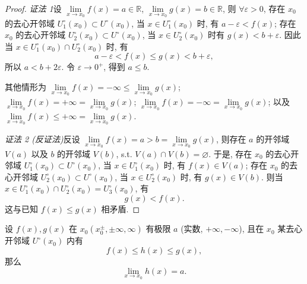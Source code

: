 \begin{proof}
\textit{证法 1}\quad 设 $\lim\limits_{x \to x_0} f(x) = a \in \mathbb{R}$, $\lim\limits_{x \to x_0} g(x) = b \in \mathbb{R}$, 则 $\forall \varepsilon > 0$, 存在 $x_0$ 的去心开邻域 $U_1^\circ(x_0) \subset U^\circ(x_0)$, 当 $x \in U_1^\circ(x_0)$ 时, 有 $a - \varepsilon < f(x)$; 存在 $x_0$ 的去心开邻域 $U_2^\circ(x_0) \subset U^\circ(x_0)$, 当 $x \in U_2^\circ(x_0)$ 时有 $g(x) < b + \varepsilon$. 因此当 $x \in U_1^\circ(x_0) \cap U_2^\circ(x_0)$ 时, 有
\[
a-\varepsilon<f(x)\leqslant g(x)<b+\varepsilon,
\]
所以 $a < b + 2\varepsilon$. 令 $\varepsilon \to 0^{+}$, 得到 $a \leqslant b$.

其他情形为 $\lim\limits_{x \to x_0} f(x) = -\infty \leqslant \lim\limits_{x \to x_0} g(x)$; $\lim\limits_{x \to x_0} f(x) = +\infty = \lim\limits_{x \to x_0} g(x)$; $\lim\limits_{x \to x_0} f(x) = -\infty = \lim\limits_{x \to x_0} g(x)$; 以及 $\lim\limits_{x \to x_0} f(x) \leqslant +\infty = \lim\limits_{x \to x_0} g(x)$.

\textit{证法 2 (反证法)}\quad 反设 $\lim\limits_{x\to x_{0}}f(x)=a>b=\lim\limits_{x\to x_{0}}g(x)$, 则存在 $a$ 的开邻域 $V(a)$ 以及 $b$ 的开邻域 $V(b)$, s.t. $V(a)\cap V(b)=\varnothing$. 于是, 存在 $x_{0}$ 的去心开邻域 $U_{1}^{\circ}(x_{0})\subset U^{\circ}(x_{0})$, 当 $x\in U_{1}^{\circ}(x_{0})$ 时, 有 $f(x)\in V(a)$; 存在 $x_{0}$ 的去心开邻域 $U_{2}^{\circ}(x_{0})\subset U^{\circ}(x_{0})$, 当 $x\in U_{2}^{\circ}(x_{0})$ 时, 有 $g(x)\in V(b)$. 则当 $x\in U_{1}^{\circ}(x_{0})\cap U_{2}^{\circ}(x_{0})=U_{3}^{\circ}(x_{0})$, 有
\[
g(x)<f(x).
\]
这与已知 $f(x) \leqslant g(x)$ 相矛盾.
\end{proof}

\begin{theorem}[夹逼定理]\label{thm:2.2.5}
设 $f(x), g(x)$ 在 $x_{0}(x_{0}^{\pm}, \pm\infty, \infty)$ 有极限 $a$ (实数, $+\infty, -\infty$), 且在 $x_{0}$ 某去心开邻域 $U^{\circ}(x_{0})$ 内有
\[
f(x)\leqslant h(x)\leqslant g(x),
\]
那么
\[
\lim_{x\to x_{0}}h(x)=a.
\]
\end{theorem}

